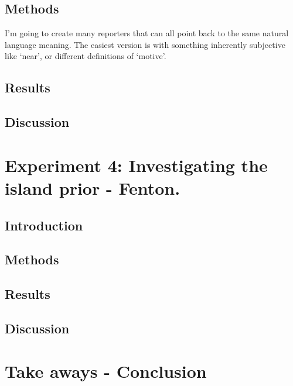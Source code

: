 \subsection{Methods}
I'm going to create many reporters that can all point back to the same natural language meaning. The easiest version is with something inherently subjective like `near', or different definitions of `motive'.

\subsection{Results}

\subsection{Discussion}



\section{Experiment 4: Investigating the island prior - Fenton.}
\subsection{Introduction}

\subsection{Methods}

\subsection{Results}

\subsection{Discussion}

\section{Take aways - Conclusion}


